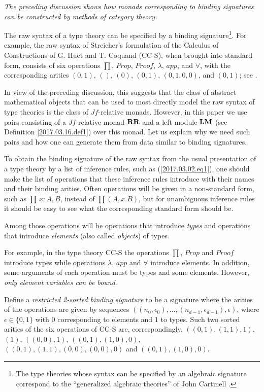 \documentclass[12pt]{amsart}
\newcommand{\RR}{{\bf RR}}
\newcommand{\LM}{{\bf LM}}
\begin{document}
{\em The preceding discussion shows how monads corresponding to binding
  signatures can be constructed by methods of category theory.}

The raw syntax of a type theory can be specified by a binding
signature\footnote{The type theories whose syntax can be specified by an
  algebraic signature correspond to the ``generalized algebraic theories'' of
  John Cartmell \cite{Cartmell1,Cartmell0,Garner}.}.  For
example, the raw syntax of Streicher's formulation of the Calculus of
Constructions of G. Huet and T. Coquand (CC-S), when brought into standard
form, consists of six operations $\prod$, $Prop$, $Proof$, $\lambda$, $app$, and
$\forall$, with the corresponding arities $(0,1)$, $()$, $(0)$, $(0,1)$,
$(0,1,0,0)$, and $(0,1)$; see \cite[p.~157]{Streicher}.

In view of the preceding discussion, this suggests that the class of abstract
mathematical objects that can be used to most directly model the raw syntax of
type theories is the class of $Jf$-relative monads. However, in this paper we
use pairs consisting of a $Jf$-relative monad $\RR$ and a left module $\LM$ (see
Definition \ref{2017.03.16.def1}) over this monad. Let us explain why we need
such pairs and how one can generate them from data similar to binding
signatures.

To obtain the binding signature of the raw syntax from the usual presentation
of a type theory by a list of inference rules, such as (\ref{2017.03.02.eq1}),
one should make the list of operations that these inference rules introduce
with their names and their binding arities. Often operations will be given in a
non-standard form, such as $\prod\,x:A,B$, instead of $\prod(A,x.B)$, but for
unambiguous inference rules it should be easy to see what the corresponding
standard form should be.

Among those operations will be operations that introduce {\em types} and
operations that introduce {\em elements} (also called {\em objects}) of types.

For example, in the type theory CC-S the operations $\prod$, $Prop$ and $Proof$
introduce types while operations $\lambda$, $app$ and $\forall$ introduce
elements.  In addition, some arguments of each operation must be types and some
elements. However, {\em only element variables can be bound}.

Define a {\em restricted 2-sorted binding signature} to be a signature where the arities of the
operations are given by sequences
$((n_0,\epsilon_0),\dots,(n_{d-1},\epsilon_{d-1}),\epsilon)$, where
$\epsilon\in\{0,1\}$ with $0$ corresponding to elements and $1$ to types. Such
two sorted arities of the six operations of CC-S are, correspondingly,
$((0,1),(1,1),1)$, $(1)$, $((0,0),1)$, $((0,1),(1,0),0)$,
$((0,1),(1,1),(0,0),(0,0),0)$ and $((0,1),(1,0),0)$.
\end{document}
